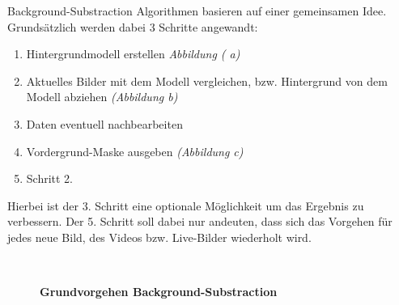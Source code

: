 Background-Substraction Algorithmen basieren auf einer gemeinsamen Idee.
Grundsätzlich werden dabei 3 Schritte angewandt:
\begin{enumerate}
\item Hintergrundmodell erstellen \textit{Abbildung ( a)}
\item Aktuelles Bilder mit dem Modell vergleichen, bzw. Hintergrund von dem Modell abziehen \textit{(Abbildung  b)}
\item Daten eventuell nachbearbeiten
\item Vordergrund-Maske ausgeben \textit{(Abbildung  c)}
\item Schritt 2.
\end{enumerate}
Hierbei ist der 3. Schritt eine optionale Möglichkeit um das Ergebnis zu verbessern. 
Der 5. Schritt soll dabei nur andeuten, dass sich das Vorgehen für jedes neue Bild, des Videos bzw. Live-Bilder wiederholt wird.
\begin{figure}[ht]
\qquad
{}\\
\begin{center}
\par\end{center}
\caption{\textbf{Grundvorgehen Background-Substraction}}
\label{Fig:background}
\end{figure}


